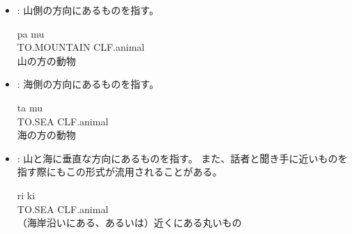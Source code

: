 \begin{itemize}
    \item {} : {山側}の方向にあるものを指す。
        \begin{exe}
            \ex \gll pa mu \\
            TO.MOUNTAIN CLF.animal \\
            \glt 山の方の動物
        \end{exe}
    \item {} : {海側}の方向にあるものを指す。
        \begin{exe}
            \ex \gll ta mu \\
            TO.SEA CLF.animal \\
            \glt 海の方の動物
        \end{exe}
    \item {} : 山と海に{垂直な方向}にあるものを指す。
    また、話者と聞き手に近いものを指す際にもこの形式が流用されることがある。
        \begin{exe}
            \ex \gll ri ki \\
            TO.SEA CLF.animal \\
            \glt （海岸沿いにある、あるいは）近くにある丸いもの
        \end{exe}
\end{itemize}